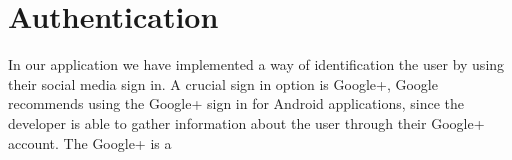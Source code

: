 \section{Authentication}
In our application we have implemented a way of identification the user by using their social media sign in.
A crucial sign in option is Google+, Google recommends using the Google+ sign in for Android applications, since the developer is able to gather 
information about the user through their Google+ account.
The Google+ is a    

